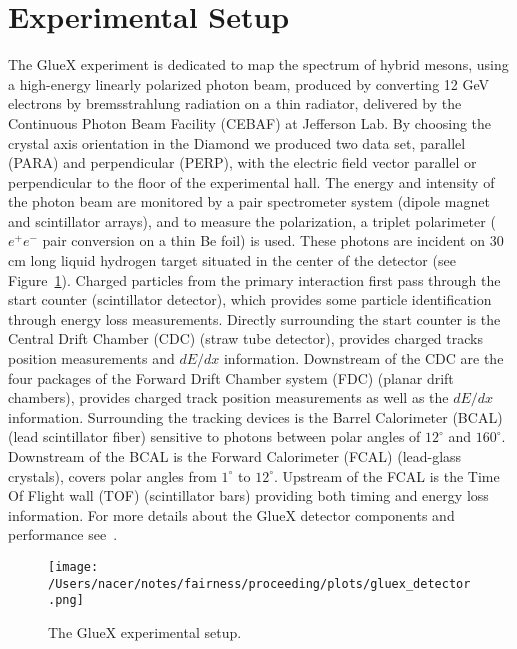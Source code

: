 \documentclass[a4paper]{jpconf}
\begin{document}
\section{Experimental Setup}
The GlueX experiment is dedicated to map the spectrum of hybrid mesons, using a high-energy linearly polarized photon beam, produced by converting 12 GeV electrons by bremsstrahlung radiation on a thin radiator, delivered by the Continuous Photon Beam Facility (CEBAF) at Jefferson Lab. By choosing the crystal axis orientation in the Diamond we produced two data set, parallel (PARA) and perpendicular (PERP), with the electric field vector parallel or perpendicular to the floor of the experimental hall. The energy and intensity of the photon beam are monitored by a pair spectrometer system (dipole magnet and scintillator arrays), and to measure the polarization, a triplet polarimeter ($e^{+}e^{-}$ pair conversion on a thin Be foil) is used. These photons are incident on 30 cm long liquid hydrogen target situated in the center of the detector (see Figure~\ref{fig.1}). Charged particles from the primary interaction first pass through the start counter (scintillator detector), which provides some particle identification through energy loss measurements. Directly surrounding the start counter is the Central Drift Chamber (CDC) (straw tube detector), provides charged tracks position measurements and $dE/dx$ information. Downstream of the CDC are the four packages of the Forward Drift Chamber system (FDC) (planar drift chambers), provides charged track position measurements as well as the $dE/dx$ information. Surrounding the tracking devices is the Barrel Calorimeter (BCAL) (lead scintillator fiber) sensitive to photons between polar angles of $12^{\circ}$ and $160^{\circ}$. Downstream of the BCAL is the Forward Calorimeter (FCAL) (lead-glass crystals), covers polar angles from $1^{\circ}$ to $12^{\circ}$. Upstream of the FCAL is the Time Of Flight wall (TOF) (scintillator bars) providing both timing and energy loss information. For more details about the GlueX detector components and performance see~\cite{ref.3}.

\begin{figure}[h]
    \centering
    \texttt{[image: /Users/nacer/notes/fairness/proceeding/plots/gluex\_detector.png]}
    \caption{\label{fig.1}The GlueX experimental setup.}
\end{figure}
\end{document}
